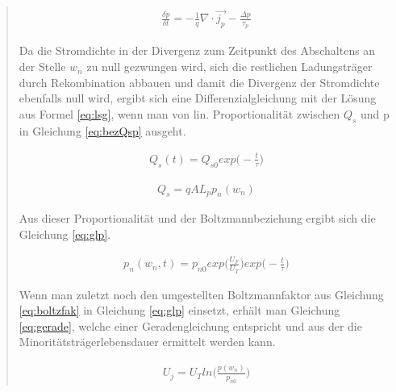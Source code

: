 \begin{quote}
	\begin{equation}
         \begin{split}
             \frac{\delta p}{\delta t}=-\frac{1}{q}\nabla \cdot \vec{j_{p}}-\frac{\Delta p}{\tau_{p}}
         \end{split}
         \label{eq:bilanz}
    \end{equation}
      
    Da die Stromdichte in der Divergenz zum Zeitpunkt des Abschaltens an der 
    Stelle $w_{n}$ zu null gezwungen wird, sich die restlichen Ladungsträger 
    durch Rekombination abbauen und damit die Divergenz der Stromdichte 
    ebenfalls null wird, ergibt sich eine Differenzialgleichung mit der Lösung 
    aus Formel \ref{eq:lsg}, wenn man von lin. Proportionalität zwischen $Q_{s}$ 
    und p in Gleichung \ref{eq:bezQsp} ausgeht.
    
    \begin{equation}
         \begin{split}
             Q_{s}(t)=Q_{s0}exp\Big(-\frac{t}{\tau}\Big)
         \end{split}
         \label{eq:lsg}
    \end{equation}
    
    \begin{equation}
         \begin{split}
             Q_{s}=qAL_{p}p_{n}(w_{n})
         \end{split}
         \label{eq:bezQsp}
    \end{equation}
	
	Aus dieser Proportionalität und der Boltzmannbeziehung ergibt sich die 
	Gleichung \ref{eq:glp}.
	
	\begin{equation}
         \begin{split}
             p_{n}(w_{n},t)=p_{n0}exp\Big(\frac{U_{F}}{U_{T}}\Big)exp\Big(-\frac{t}{\tau}\Big)
         \end{split}
         \label{eq:glp}
    \end{equation}
	
	Wenn man zuletzt noch den umgestellten Boltzmannfaktor aus Gleichung
	\ref{eq:boltzfak} in Gleichung \ref{eq:glp} einsetzt, erhält man Gleichung
	\ref{eq:gerade}, welche einer Geradengleichung entspricht und aus der die 
	Minoritätsträgerlebensdauer ermittelt werden kann.
	
	\begin{equation}
         \begin{split}
             U_{j}=U_{T}ln\Big(\frac{p(w_{n})}{p_{n0}}\Big)
         \end{split}
         \label{eq:boltzfak}
    \end{equation}
	

\end{quote}
